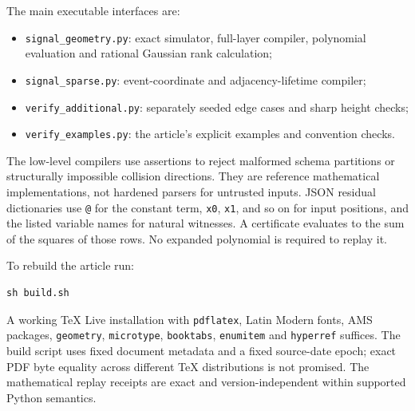 \documentclass[11pt,letterpaper]{article}
\numberwithin{equation}{section}
\theoremstyle{definition}
\theoremstyle{remark}
\begin{document}
The main executable interfaces are:
\begin{itemize}
\item \texttt{signal\_geometry.py}: exact simulator, full-layer compiler, polynomial evaluation and rational Gaussian rank calculation;
\item \texttt{signal\_sparse.py}: event-coordinate and adjacency-lifetime compiler;
\item \texttt{verify\_additional.py}: separately seeded edge cases and sharp height checks;
\item \texttt{verify\_examples.py}: the article's explicit examples and convention checks.
\end{itemize}
The low-level compilers use assertions to reject malformed schema partitions or structurally impossible collision directions. They are reference mathematical implementations, not hardened parsers for untrusted inputs. JSON residual dictionaries use \texttt{@} for the constant term, \texttt{x0}, \texttt{x1}, and so on for input positions, and the listed variable names for natural witnesses. A certificate evaluates to the sum of the squares of those rows. No expanded polynomial is required to replay it.

To rebuild the article run:
\begin{verbatim}
sh build.sh
\end{verbatim}
A working TeX Live installation with \texttt{pdflatex}, Latin Modern fonts, AMS packages, \texttt{geometry}, \texttt{microtype}, \texttt{booktabs}, \texttt{enumitem} and \texttt{hyperref} suffices. The build script uses fixed document metadata and a fixed source-date epoch; exact PDF byte equality across different TeX distributions is not promised. The mathematical replay receipts are exact and version-independent within supported Python semantics.
\end{document}

